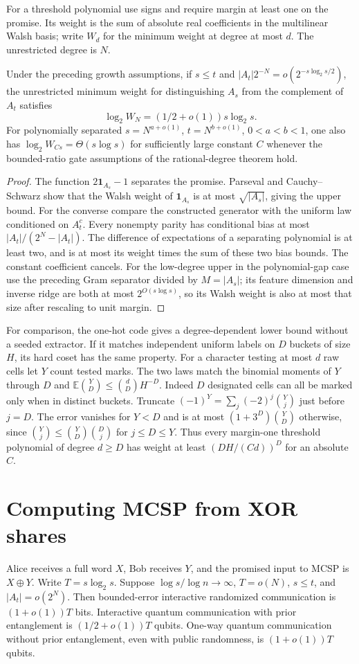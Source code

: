 For a threshold polynomial use signs and require margin at least one on the promise. Its weight is the sum of absolute real coefficients in the multilinear Walsh basis; write $W_d$ for the minimum weight at degree at most $d$. The unrestricted degree is $N$.
\begin{theorem}
Under the preceding growth assumptions, if $s\le t$ and
$|A_t|2^{-N}=o(2^{-s\log_2 s/2})$, the unrestricted minimum weight for distinguishing $A_s$ from the complement of $A_t$ satisfies
\[
 \log_2 W_N=(1/2+o(1))s\log_2s.
\]
For polynomially separated $s=N^{a+o(1)}$, $t=N^{b+o(1)}$, $0<a<b<1$, one also has $\log_2 W_{Cs}=\Theta(s\log s)$ for sufficiently large constant $C$ whenever the bounded-ratio gate assumptions of the rational-degree theorem hold.
\end{theorem}
\begin{proof}
The function $2\mathbf1_{A_s}-1$ separates the promise. Parseval and Cauchy--Schwarz show that the Walsh weight of $\mathbf1_{A_s}$ is at most $\sqrt{|A_s|}$, giving the upper bound. For the converse compare the constructed generator with the uniform law conditioned on $A_t^c$. Every nonempty parity has conditional bias at most $|A_t|/(2^N-|A_t|)$. The difference of expectations of a separating polynomial is at least two, and is at most its weight times the sum of these two bias bounds. The constant coefficient cancels. For the low-degree upper in the polynomial-gap case use the preceding Gram separator divided by $M=|A_s|$; its feature dimension and inverse ridge are both at most $2^{O(s\log s)}$, so its Walsh weight is also at most that size after rescaling to unit margin.
\end{proof}

For comparison, the one-hot code gives a degree-dependent lower bound without a seeded extractor. If it matches independent uniform labels on $D$ buckets of size $H$, its hard coset has the same property. For a character testing at most $d$ raw cells let $Y$ count tested marks. The two laws match the binomial moments of $Y$ through $D$ and $\mathbb E\binom YD\le\binom dD H^{-D}$. Indeed $D$ designated cells can all be marked only when in distinct buckets. Truncate $(-1)^Y=\sum_j(-2)^j\binom Yj$ just before $j=D$. The error vanishes for $Y<D$ and is at most $(1+3^D)\binom YD$ otherwise, since $\binom Yj\le\binom YD\binom Dj$ for $j\le D\le Y$. Thus every margin-one threshold polynomial of degree $d\ge D$ has weight at least $(DH/(Cd))^D$ for an absolute $C$.

\section{Computing MCSP from XOR shares}
Alice receives a full word $X$, Bob receives $Y$, and the promised input to MCSP is $X\oplus Y$. Write $T=s\log_2 s$. Suppose $\log s/\log n\to\infty$, $T=o(N)$, $s\le t$, and $|A_t|=o(2^N)$. Then bounded-error interactive randomized communication is $(1+o(1))T$ bits. Interactive quantum communication with prior entanglement is $(1/2+o(1))T$ qubits. One-way quantum communication without prior entanglement, even with public randomness, is $(1+o(1))T$ qubits.

